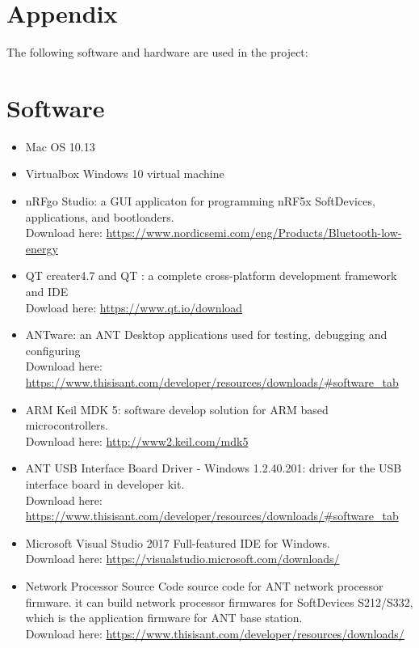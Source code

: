 \documentclass{article}
\begin{document}



\section{Appendix}
The following software and hardware are used in the project:

\appendix
\section{Software}
\begin{itemize}
\item Mac OS 10.13

\item Virtualbox Windows 10 virtual machine

\item nRFgo Studio: a GUI applicaton for programming nRF5x SoftDevices, applications, and bootloaders. \\ Download here: \url{https://www.nordicsemi.com/eng/Products/Bluetooth-low-energy}

\item QT creater4.7 and QT  : a complete cross-platform development framework and IDE \\Dowload here:  \url{https://www.qt.io/download}

\item ANTware: an ANT Desktop applications used for testing, debugging and configuring \\ Download here: \url{ https://www.thisisant.com/developer/resources/downloads/#software_tab}

\item ARM Keil MDK 5: software develop solution for ARM based microcontrollers. 
\\Download here: \url{http://www2.keil.com/mdk5}

\item ANT USB Interface Board Driver - Windows 1.2.40.201: driver for the USB interface board in developer kit. \\ Download here: \url{https://www.thisisant.com/developer/resources/downloads/#software_tab}

\item Microsoft Visual Studio 2017 Full-featured IDE for Windows. \\Download here: \url{https://visualstudio.microsoft.com/downloads/}

\item Network Processor Source Code source code for ANT network processor firmware. it can build network processor firmwares for SoftDevices S212/S332, which is the application firmware for ANT base station. \\ Download here: 
\url{https://www.thisisant.com/developer/resources/downloads/}


\end{itemize}
\end{document}
